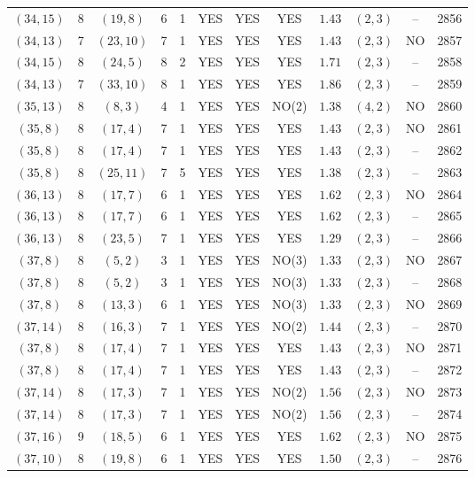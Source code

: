 \begin{longtable}{|c|c|c|c|c|c|c|c|c|c|c|c|}
$(34,15)$ & 8 & $(19,8)$ & 6 & 1 & YES & YES & YES & $1.43$ & $(2,3)$ & -- & 2856\\
$(34,13)$ & 7 & $(23,10)$ & 7 & 1 & YES & YES & YES & $1.43$ & $(2,3)$ & NO & 2857\\
$(34,15)$ & 8 & $(24,5)$ & 8 & 2 & YES & YES & YES & $1.71$ & $(2,3)$ & -- & 2858\\
$(34,13)$ & 7 & $(33,10)$ & 8 & 1 & YES & YES & YES & $1.86$ & $(2,3)$ & -- & 2859\\
$(35,13)$ & 8 & $(8,3)$ & 4 & 1 & YES & YES & NO(2) & $1.38$ & $(4,2)$ & NO & 2860\\
$(35,8)$ & 8 & $(17,4)$ & 7 & 1 & YES & YES & YES & $1.43$ & $(2,3)$ & NO & 2861\\
$(35,8)$ & 8 & $(17,4)$ & 7 & 1 & YES & YES & YES & $1.43$ & $(2,3)$ & -- & 2862\\
$(35,8)$ & 8 & $(25,11)$ & 7 & 5 & YES & YES & YES & $1.38$ & $(2,3)$ & -- & 2863\\
$(36,13)$ & 8 & $(17,7)$ & 6 & 1 & YES & YES & YES & $1.62$ & $(2,3)$ & NO & 2864\\
$(36,13)$ & 8 & $(17,7)$ & 6 & 1 & YES & YES & YES & $1.62$ & $(2,3)$ & -- & 2865\\
$(36,13)$ & 8 & $(23,5)$ & 7 & 1 & YES & YES & YES & $1.29$ & $(2,3)$ & -- & 2866\\
$(37,8)$ & 8 & $(5,2)$ & 3 & 1 & YES & YES & NO(3) & $1.33$ & $(2,3)$ & NO & 2867\\
$(37,8)$ & 8 & $(5,2)$ & 3 & 1 & YES & YES & NO(3) & $1.33$ & $(2,3)$ & -- & 2868\\
$(37,8)$ & 8 & $(13,3)$ & 6 & 1 & YES & YES & NO(3) & $1.33$ & $(2,3)$ & NO & 2869\\
$(37,14)$ & 8 & $(16,3)$ & 7 & 1 & YES & YES & NO(2) & $1.44$ & $(2,3)$ & -- & 2870\\
$(37,8)$ & 8 & $(17,4)$ & 7 & 1 & YES & YES & YES & $1.43$ & $(2,3)$ & NO & 2871\\
$(37,8)$ & 8 & $(17,4)$ & 7 & 1 & YES & YES & YES & $1.43$ & $(2,3)$ & -- & 2872\\
$(37,14)$ & 8 & $(17,3)$ & 7 & 1 & YES & YES & NO(2) & $1.56$ & $(2,3)$ & NO & 2873\\
$(37,14)$ & 8 & $(17,3)$ & 7 & 1 & YES & YES & NO(2) & $1.56$ & $(2,3)$ & -- & 2874\\
$(37,16)$ & 9 & $(18,5)$ & 6 & 1 & YES & YES & YES & $1.62$ & $(2,3)$ & NO & 2875\\
$(37,10)$ & 8 & $(19,8)$ & 6 & 1 & YES & YES & YES & $1.50$ & $(2,3)$ & -- & 2876\\

\end{longtable}
